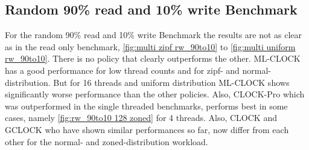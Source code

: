 \documentclass[
	12pt,
	a4paper,
	abstract,
	bibliography=totoc,
	chapterprefix,
	headings=openright,
	numbers=endperiod,
	parskip=half,
	twoside,
]{scrreprt}
\begin{document}
\subsection{Random 90\% read and 10\% write Benchmark}

For the random 90\% read and 10\% write Benchmark the results are not as clear as in the read only benchmark, \cref{fig:multi zipf rw_90to10} to 
\cref{fig:multi uniform rw_90to10}.
There is no policy that clearly outperforms the other.
ML-CLOCK has a good performance for low thread counts and for zipf- and normal-distribution.
But for 16 threads and uniform distribution ML-CLOCK shows significantly worse performance than the other policies.
Also, CLOCK-Pro which was outperformed in the single threaded benchmarks, performs best in some cases, namely \cref{fig:rw_90to10 128 zoned} for 4 threads.
Also, CLOCK and GCLOCK who have shown similar performances so far, now differ from each other for the normal- and zoned-distribution workload.
\end{document}
